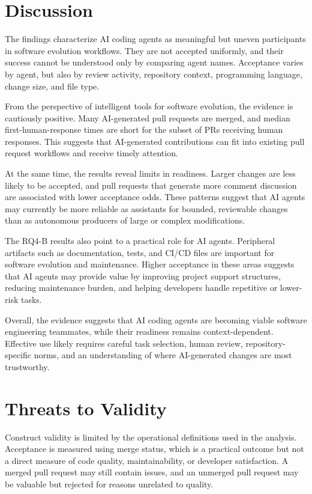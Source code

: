 \documentclass[sigconf,nonacm]{acmart}
\begin{document}
\section{Discussion}

The findings characterize AI coding agents as meaningful but uneven participants in software evolution workflows. They are not accepted uniformly, and their success cannot be understood only by comparing agent names. Acceptance varies by agent, but also by review activity, repository context, programming language, change size, and file type.

From the perspective of intelligent tools for software evolution, the evidence is cautiously positive. Many AI-generated pull requests are merged, and median first-human-response times are short for the subset of PRs receiving human responses. This suggests that AI-generated contributions can fit into existing pull request workflows and receive timely attention.

At the same time, the results reveal limits in readiness. Larger changes are less likely to be accepted, and pull requests that generate more comment discussion are associated with lower acceptance odds. These patterns suggest that AI agents may currently be more reliable as assistants for bounded, reviewable changes than as autonomous producers of large or complex modifications.

The RQ4-B results also point to a practical role for AI agents. Peripheral artifacts such as documentation, tests, and CI/CD files are important for software evolution and maintenance. Higher acceptance in these areas suggests that AI agents may provide value by improving project support structures, reducing maintenance burden, and helping developers handle repetitive or lower-risk tasks.

Overall, the evidence suggests that AI coding agents are becoming viable software engineering teammates, while their readiness remains context-dependent. Effective use likely requires careful task selection, human review, repository-specific norms, and an understanding of where AI-generated changes are most trustworthy.

\section{Threats to Validity}

Construct validity is limited by the operational definitions used in the analysis. Acceptance is measured using merge status, which is a practical outcome but not a direct measure of code quality, maintainability, or developer satisfaction. A merged pull request may still contain issues, and an unmerged pull request may be valuable but rejected for reasons unrelated to quality.
\end{document}
